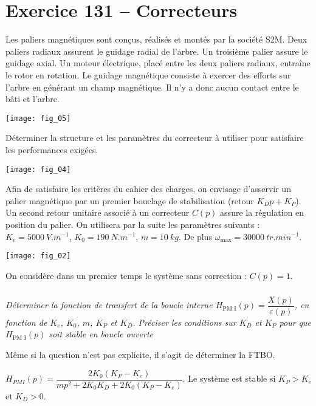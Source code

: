\section*{Exercice 131 -- Correcteurs}
\setcounter{exo}{0}
Les paliers magnétiques sont conçus, réalisés et montés par la société S2M.
Deux paliers radiaux assurent le guidage radial de l'arbre. Un troisième
palier assure le guidage axial. Un moteur électrique, placé entre les deux
paliers radiaux, entraîne le rotor en rotation. Le guidage magnétique consiste à exercer des efforts sur l'arbre en générant un
champ magnétique. Il n'y a donc aucun contact entre le bâti et l'arbre.

\begin{center}
\texttt{[image: fig\_05]}
\end{center}


\begin{obj}
Déterminer la structure et les paramètres du correcteur à utiliser pour satisfaire les performances exigées.
\end{obj}


\begin{center}
\texttt{[image: fig\_04]}
\end{center}


Afin de satisfaire les critères du cahier des charges, on envisage d'asservir un
palier magnétique par un premier bouclage de stabilisation (retour $K_D p+K_P$).
Un second retour unitaire associé à un correcteur $C(p)$ assure la régulation en
position du palier. On utilisera par la suite les
paramètres suivants : $K_e=\SI{5000}{V.m^{-1}}$, $K_0=\SI{190}{N.m^{-1}}$, $m=\SI{10}{kg}$.
De plus $\omega_{\text{max}}=\SI{30000}{tr.min^{-1}}$.

\begin{center}
\texttt{[image: fig\_02]}
\end{center}

On considère dans un premier temps le système sans correction : $C(p)=1$.

\subparagraph{}\textit{Déterminer la fonction de transfert de la boucle interne $H_{\text{PM I}}(p) = \dfrac{X(p)}{\varepsilon(p)}$, en fonction de $K_e$, $K_0$, $m$, $K_P$ et $K_D$. Préciser les conditions
sur $K_D$ et $K_P$ pour que $H_{\text{PM I}}(p)$ soit stable en boucle ouverte}
\ifprof
\begin{corrige}
Même si la question n'est pas explicite, il s'agit de déterminer la FTBO. 

$H_{PMI}(p)=\dfrac{2K_0\left(K_P- K_e\right)}{mp^2+2K_0K_D+2K_0\left(K_P- K_e\right)}$. Le système est stable si 
$K_P> K_e$ et $K_D>0$.

\end{corrige}
\else
\fi

